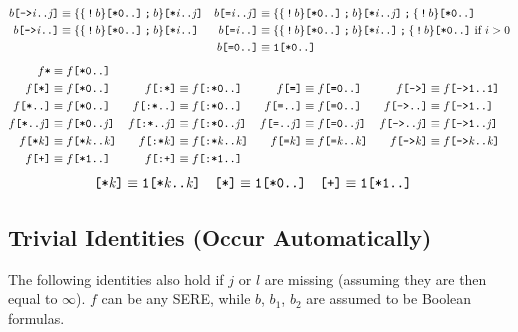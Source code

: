 \documentclass[a4paper,twoside,10pt,DIV=12]{scrreprt}
\DeclareMathOperator{\NOT}{\texttt{!}}
\newcommand{\CONCAT}{\mathbin{\texttt{;}}}
\newcommand{\0}{\texttt{0}}
\newcommand{\1}{\texttt{1}}
\newcommand{\STAR}[1]{\texttt{[*#1]}}
\newcommand{\FSTAR}[1]{\texttt{[:*#1]}}
\newcommand{\STARALT}{\texttt{*}}
\newcommand{\EQUAL}[1]{\texttt{[=#1]}}
\newcommand{\GOTO}[1]{\texttt{[->#1]}}
\newcommand{\PLUS}{\texttt{[+]}}
\newcommand{\FPLUS}{\texttt{[:+]}}
\newcommand\mvar[1]{\ensuremath{\mathit{#1}}}
\begin{document}
\begin{align*}
  b\GOTO{\mvar{i}..\mvar{j}} &\equiv \mathtt{\{\{}\NOT b\mathtt{\}}\STAR{0..}\CONCAT b\mathtt{\}}\STAR{\mvar{i}..\mvar{j}} &
  b\EQUAL{\mvar{i}..\mvar{j}} &\equiv \mathtt{\{\{}\NOT b\mathtt{\}}\STAR{0..}\CONCAT b\mathtt{\}}\STAR{\mvar{i}..\mvar{j}}\CONCAT \mathtt{\{}\NOT b\mathtt{\}}\STAR{0..} \\
  b\GOTO{\mvar{i}..} &\equiv \mathtt{\{\{}\NOT b\mathtt{\}}\STAR{0..}\CONCAT b\mathtt{\}}\STAR{\mvar{i}..} &
  b\EQUAL{\mvar{i}..} &\equiv \mathtt{\{\{}\NOT b\mathtt{\}}\STAR{0..}\CONCAT b\mathtt{\}}\STAR{\mvar{i}..}\CONCAT \mathtt{\{}\NOT b\mathtt{\}}\STAR{0..}\text{~if~}i>0 \\
  && b\EQUAL{0..} &\equiv \1\STAR{0..}
\end{align*}
\begin{align*}
  f\STARALT &\equiv f\STAR{0..}\\
  f\STAR{}    &\equiv f\STAR{0..}  &
  f\FSTAR{}    &\equiv f\FSTAR{0..}  &
  f\EQUAL{}   &\equiv f\EQUAL{0..} &
  f\GOTO{}   &\equiv f\GOTO{1..1} \\
  f\STAR{..}  &\equiv f\STAR{0..}  &
  f\FSTAR{..}  &\equiv f\FSTAR{0..}  &
  f\EQUAL{..}  &\equiv f\EQUAL{0..} &
  f\GOTO{..}  &\equiv f\GOTO{1..} \\
  f\STAR{..\mvar{j}} &\equiv f\STAR{0..\mvar{j}} &
  f\FSTAR{..\mvar{j}} &\equiv f\FSTAR{0..\mvar{j}} &
  f\EQUAL{..\mvar{j}} &\equiv f\EQUAL{0..\mvar{j}} &
  f\GOTO{..\mvar{j}} &\equiv f\GOTO{1..\mvar{j}} \\
  f\STAR{\mvar{k}}  &\equiv f\STAR{\mvar{k}..\mvar{k}}  &
  f\FSTAR{\mvar{k}}  &\equiv f\FSTAR{\mvar{k}..\mvar{k}}  &
  f\EQUAL{\mvar{k}}   &\equiv f\EQUAL{\mvar{k}..\mvar{k}} &
  f\GOTO{\mvar{k}}   &\equiv f\GOTO{\mvar{k}..\mvar{k}} \\
  f\PLUS{}    &\equiv f\STAR{1..} &
  f\FPLUS{}    &\equiv f\FSTAR{1..}
\end{align*}
\begin{align*}
\STAR{\mvar{k}}    &\equiv \1\STAR{\mvar{k}..\mvar{k}} &
\STAR{}    &\equiv \1\STAR{0..} &
\PLUS{}    &\equiv \1\STAR{1..}
\end{align*}

\subsection{Trivial Identities (Occur Automatically)}

The following identities also hold if $j$ or $l$ are missing (assuming
they are then equal to $\infty$).  $f$ can be any SERE, while $b$,
$b_1$, $b_2$ are assumed to be Boolean formulas.
\end{document}
